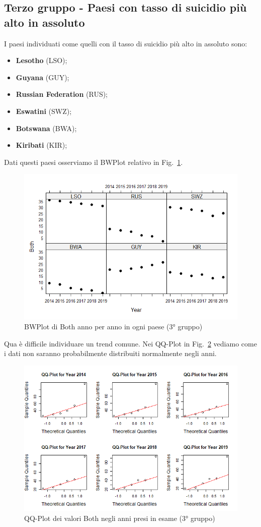 \documentclass[conference]{IEEEtran}
\begin{document}
\subsection{Terzo gruppo - Paesi con tasso di suicidio più alto in assoluto}

I paesi individuati come quelli con il tasso di suicidio più alto
in assoluto sono:
\begin{itemize}
    \item \textbf{Lesotho} (LSO);
    \item \textbf{Guyana} (GUY);
    \item \textbf{Russian Federation} (RUS);
    \item \textbf{Eswatini} (SWZ);
    \item \textbf{Botswana} (BWA);
    \item \textbf{Kiribati} (KIR); 
\end{itemize}
Dati questi paesi osserviamo il BWPlot relativo in Fig.~\ref{9thridgroup}.
\begin{figure}[htbp]
    \centerline{\includegraphics[width=.5\textwidth]{img/9 - Thirdgroup.png}}
    \caption{BWPlot di Both anno per anno in ogni paese (3° gruppo)}
    \label{9thridgroup}
\end{figure}
Qua è difficile individuare un trend comune.
Nei QQ-Plot in Fig.~\ref{10thirdqq} vediamo come i dati non saranno
probabilmente distribuiti normalmente negli anni.
\begin{figure}[htbp]
    \centerline{\includegraphics[width=.5\textwidth]{img/10 - Thirdqq.png}}
    \caption{QQ-Plot dei valori Both negli anni presi in esame (3° gruppo)}
    \label{10thirdqq}
\end{figure}
\end{document}

